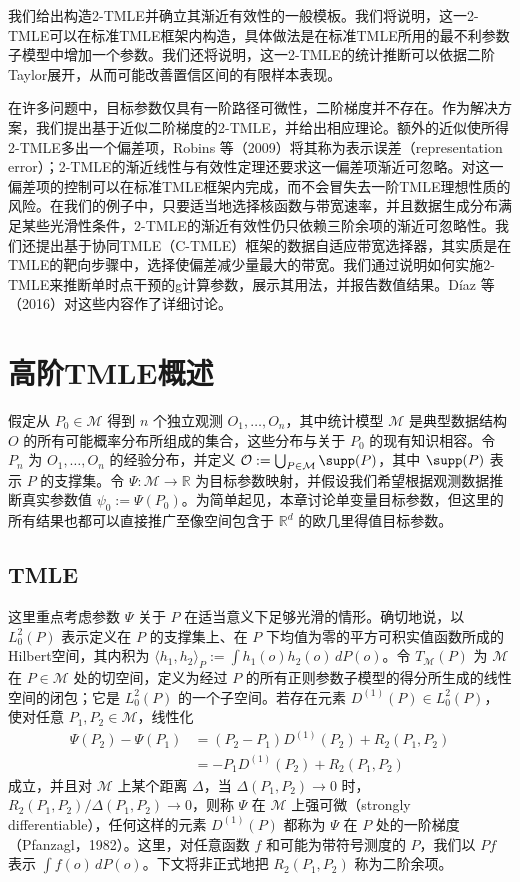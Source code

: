 我们给出构造2-TMLE并确立其渐近有效性的一般模板。我们将说明，这一2-TMLE可以在标准TMLE框架内构造，具体做法是在标准TMLE所用的最不利参数子模型中增加一个参数。我们还将说明，这一2-TMLE的统计推断可以依据二阶Taylor展开，从而可能改善置信区间的有限样本表现。

在许多问题中，目标参数仅具有一阶路径可微性，二阶梯度并不存在。作为解决方案，我们提出基于近似二阶梯度的2-TMLE，并给出相应理论。额外的近似使所得2-TMLE多出一个偏差项，Robins 等（2009）将其称为表示误差（representation error）；2-TMLE的渐近线性与有效性定理还要求这一偏差项渐近可忽略。对这一偏差项的控制可以在标准TMLE框架内完成，而不会冒失去一阶TMLE理想性质的风险。在我们的例子中，只要适当地选择核函数与带宽速率，并且数据生成分布满足某些光滑性条件，2-TMLE的渐近有效性仍只依赖三阶余项的渐近可忽略性。我们还提出基于协同TMLE（C-TMLE）框架的数据自适应带宽选择器，其实质是在TMLE的靶向步骤中，选择使偏差减少量最大的带宽。我们通过说明如何实施2-TMLE来推断单时点干预的g计算参数，展示其用法，并报告数值结果。Díaz 等（2016）对这些内容作了详细讨论。

\section{高阶TMLE概述}

假定从 $P_0\in\mathcal M$ 得到 $n$ 个独立观测 $O_1,\ldots,O_n$，其中统计模型 $\mathcal M$ 是典型数据结构 $O$ 的所有可能概率分布所组成的集合，这些分布与关于 $P_0$ 的现有知识相容。令 $P_n$ 为 $O_1,\ldots,O_n$ 的经验分布，并定义 $\mathcal O:=\bigcup_{P\in\mathcal M}\supp(P)$，其中 $\supp(P)$ 表示 $P$ 的支撑集。令 $\Psi:\mathcal M\to\mathbb R$ 为目标参数映射，并假设我们希望根据观测数据推断真实参数值 $\psi_0:=\Psi(P_0)$。为简单起见，本章讨论单变量目标参数，但这里的所有结果也都可以直接推广至像空间包含于 $\mathbb R^d$ 的欧几里得值目标参数。

\subsection{TMLE}

这里重点考虑参数 $\Psi$ 关于 $P$ 在适当意义下足够光滑的情形。确切地说，以 $L_0^2(P)$ 表示定义在 $P$ 的支撑集上、在 $P$ 下均值为零的平方可积实值函数所成的Hilbert空间，其内积为 $\langle h_1,h_2\rangle_P:=\int h_1(o)h_2(o)\,dP(o)$。令 $T_{\mathcal M}(P)$ 为 $\mathcal M$ 在 $P\in\mathcal M$ 处的切空间，定义为经过 $P$ 的所有正则参数子模型的得分所生成的线性空间的闭包；它是 $L_0^2(P)$ 的一个子空间。若存在元素 $D^{(1)}(P)\in L_0^2(P)$，使对任意 $P_1,P_2\in\mathcal M$，线性化
\[
\begin{aligned}
\Psi(P_2)-\Psi(P_1)
 &= (P_2-P_1)D^{(1)}(P_2)+R_2(P_1,P_2)\\
 &= -P_1D^{(1)}(P_2)+R_2(P_1,P_2)
\end{aligned}
\]
成立，并且对 $\mathcal M$ 上某个距离 $\Delta$，当 $\Delta(P_1,P_2)\to0$ 时，$R_2(P_1,P_2)/\Delta(P_1,P_2)\to0$，则称 $\Psi$ 在 $\mathcal M$ 上强可微（strongly differentiable），任何这样的元素 $D^{(1)}(P)$ 都称为 $\Psi$ 在 $P$ 处的一阶梯度（Pfanzagl，1982）。这里，对任意函数 $f$ 和可能为带符号测度的 $P$，我们以 $Pf$ 表示 $\int f(o)\,dP(o)$。下文将非正式地把 $R_2(P_1,P_2)$ 称为二阶余项。

